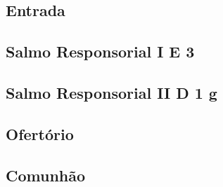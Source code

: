 
\subsection{Entrada}\label{subsection:hebdomada-sancta/missa-chrismatis/introitus}

\AllowPageFlush

\subsection[Salmo Responsorial I]{Salmo Responsorial I \textmd{E 3}}\label{subsection:hebdomada-sancta/missa-chrismatis/psalmus-responsorius-1}

\AllowPageFlush

\subsection[Salmo Responsorial II]{Salmo Responsorial II \textmd{D 1 g}}\label{subsection:hebdomada-sancta/missa-chrismatis/psalmus-responsorius-2}

\AllowPageBreak

\subsection{Ofertório}\label{subsection:hebdomada-sancta/missa-chrismatis/offertorium}

\AllowPageFlush

\subsection{Comunhão}\label{subsection:hebdomada-sancta/missa-chrismatis/communio}
